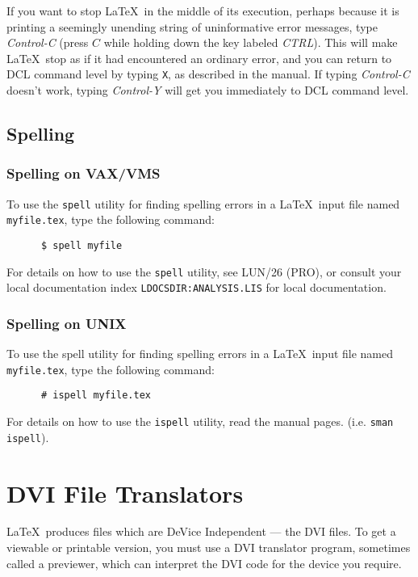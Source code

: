 If you want to stop \LaTeX\ in the middle of its execution, perhaps
because it is printing a seemingly unending string of uninformative
error messages, type {\em Control-C\/} (press $C$ while holding down
the key labeled {\em CTRL\/}).  This will make \LaTeX\ stop as if it
had encountered an ordinary error, and you can return to DCL command
level by typing \mbox{\tt X}, as described in the manual.  If typing {\em
Control-C\/} doesn't work, typing {\em Control-Y\/} will get you
immediately to DCL command level.

\subsection{Spelling}
\subsubsection{Spelling on VAX/VMS}
\label{se:vaxspell}

To use the \mbox{\tt spell} utility for finding spelling errors in a
\LaTeX\ input file named \mbox{\tt myfile.tex}, type the following
command:
\begin{verbatim}
      $ spell myfile
\end{verbatim}

For details on how to use the \mbox{\tt spell} utility, see LUN/26 (PRO), or 
consult your local documentation index {\tt LDOCSDIR:ANALYSIS.LIS} for local 
documentation.

\subsubsection{Spelling on UNIX}
\label{se:unixspell}
To use the spell utility for finding spelling errors in a
\LaTeX\ input file named \mbox{\tt myfile.tex}, type the following
command:
\begin{verbatim}
      # ispell myfile.tex
\end{verbatim}

For details on how to use the \mbox{\tt ispell} utility, read the manual pages.
(i.e. {\tt sman ispell}). 

\section{DVI File Translators}
\label{se:dvi}

\LaTeX\ produces files which are DeVice Independent --- the DVI files. To get a
viewable or printable version, you must use a DVI translator program, sometimes
called a previewer, which can interpret the DVI code for the device you
require. 

